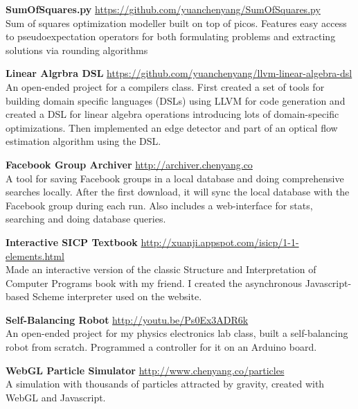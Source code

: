 \documentclass[9pt]{article}
\newenvironment{changemargin}[2]{%
  \begin{list}{}{%
      \setlength{\topsep}{0pt}%
      \setlength{\leftmargin}{#1}%
      \setlength{\rightmargin}{#2}%
      \setlength{\listparindent}{\parindent}%
      \setlength{\itemindent}{\parindent}%
      \setlength{\parsep}{\parskip}%
    }%
  \item[]}{\end{list}
}
\newenvironment{body} {
  \vspace*{-16pt}
  \begin{changemargin}{-0.25in}{-0.5in}
  }
  {\end{changemargin}
}
\begin{document}
\begin{body}
  \vspace{14pt}

  \textbf{SumOfSquares.py} \hfill \url{https://github.com/yuanchenyang/SumOfSquares.py} \\
  Sum of squares optimization modeller built on top of picos. Features easy
  access to pseudoexpectation operators for both formulating problems and
  extracting solutions via rounding algorithms
  \medskip

  \textbf{Linear Algrbra DSL} \hfill \url{https://github.com/yuanchenyang/llvm-linear-algebra-dsl} \\
  An open-ended project for a compilers class. First created a set of tools for
  building domain specific languages (DSLs) using LLVM for code generation and
  created a DSL for linear algebra operations introducing lots of
  domain-specific optimizations. Then implemented an edge detector and part of
  an optical flow estimation algorithm using the DSL.
  \medskip

  \textbf{Facebook Group Archiver} \hfill \url{http://archiver.chenyang.co}\\
  A tool for saving Facebook groups in a local database and doing comprehensive
  searches locally. After the first download, it will sync the local database
  with the Facebook group during each run. Also includes a web-interface for
  stats, searching and doing database queries. \\
  \medskip

  \textbf{Interactive SICP Textbook} \hfill
  \url{http://xuanji.appspot.com/isicp/1-1-elements.html}\\
  Made an interactive version of the classic Structure and Interpretation of
  Computer Programs book with my friend. I created the asynchronous
  Javascript-based Scheme interpreter used on the website. \\
  \medskip

  \textbf{Self-Balancing Robot} \hfill \url{http://youtu.be/Ps0Ex3ADR6k} \\
  An open-ended project for my physics electronics lab class, built a
  self-balancing robot from scratch. Programmed a controller for it on an
  Arduino board. \\
  \medskip

  \textbf{WebGL Particle Simulator} \hfill \url{http://www.chenyang.co/particles}\\
  A simulation with thousands of particles attracted by gravity, created with  WebGL and Javascript. \\
  \medskip


\end{body}
\end{document}
